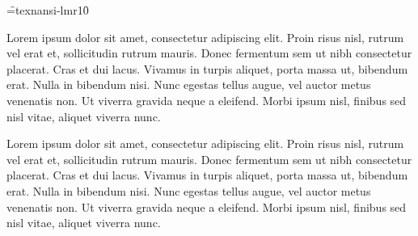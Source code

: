


\font\f=texnansi-lmr10\f

\long\def\lorem{
Lorem ipsum dolor sit amet, consectetur adipiscing elit. Proin risus nisl, rutrum vel erat et, sollicitudin rutrum mauris. Donec fermentum sem ut nibh consectetur placerat. Cras et dui lacus. Vivamus in turpis aliquet, porta massa ut, bibendum erat. Nulla in bibendum nisi. Nunc egestas tellus augue, vel auctor metus venenatis non. Ut viverra gravida neque a eleifend. Morbi ipsum nisl, finibus sed nisl vitae, aliquet viverra nunc.\par
}

\lorem
\pdfinterwordspaceon
\lorem
\bye
